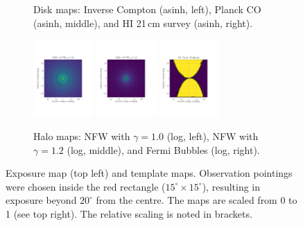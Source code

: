 \documentclass[doublespace,nopageskip]{VTthesis} %
\begin{document}
\begin{figure}
\begin{subfigure}[h]{1\textwidth}
		\caption{Disk maps: Inverse Compton (asinh, left), Planck CO (asinh, middle), and HI 21\,cm survey (asinh, right).}\label{fig:IC_map}\label{fig:CO_map}\label{fig:HI_map}
	\end{subfigure}
	\begin{subfigure}[h]{1\textwidth}
		\centering
		\includegraphics[width=0.25\textwidth,trim=0.44in 2.03in 1.29in 2.34in,clip=true]{Figures/511keV/map_DM0_log_grid.pdf}
		\includegraphics[width=0.25\textwidth,trim=0.44in 2.03in 1.29in 2.34in,clip=true]{Figures/511keV/map_DM2_log_grid.pdf}
		\includegraphics[width=0.25\textwidth,trim=0.44in 2.03in 1.29in 2.34in,clip=true]{Figures/511keV/map_FB_log_grid.pdf}
		\caption{Halo maps: NFW with $\gamma=1.0$ (log, left), NFW with $\gamma=1.2$ (log, middle), and Fermi Bubbles (log, right).}\label{fig:DM0_map}\label{fig:DM2_map}\label{fig:FB_map}
	\end{subfigure}
	\caption{Exposure map (top left) and template maps. Observation pointings were chosen inside the red rectangle ($15^{\circ} \times 15^{\circ}$), resulting in exposure beyond $20^{\circ}$ from the centre. The maps are scaled from 0 to 1 (see top right). The relative scaling is noted in brackets.}
\end{figure}
\end{document}
